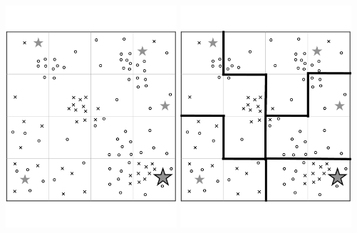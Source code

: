 \hfill
\includegraphics[width=2.5in]{assets/gerrymander-example.pdf} 
\hfill
\includegraphics[width=2.5in]{assets/gerrymander-example-solution.pdf}
\hfill\phantom{}

